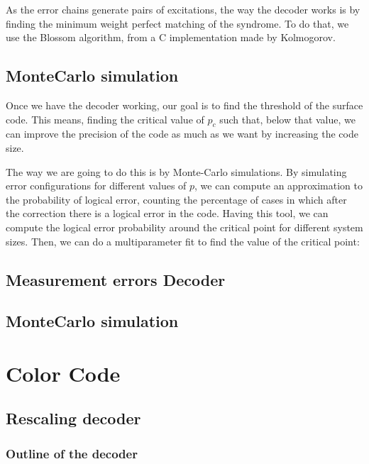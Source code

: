 \documentclass[a4paper,12pt]{article}
\begin{document}
As the error chains generate  pairs of excitations, the way the decoder works is by finding the minimum weight perfect matching of the syndrome. To do that, we use the Blossom algorithm, from a C implementation made by Kolmogorov.


\subsection{MonteCarlo simulation}

Once we have the decoder working, our goal is to find the threshold of the surface code. This means, finding the critical value of $p_c$ such that, below that value, we can improve the precision of the code as much as we want by increasing the code size.

The way we are going to do this is by Monte-Carlo simulations.  By simulating error configurations for different values of $p$, we can compute an approximation to the probability of logical error, counting the percentage of cases in which after the correction there is a logical error in the code. Having this tool, we can compute the logical error probability around the critical point for different system sizes. Then, we can do a multiparameter fit to find the value of the critical point:

\begin{figure}[ht!]
\begin{center}
\end{center}
\end{figure}


\subsection{Measurement errors Decoder}
\subsection{MonteCarlo simulation}
\newpage

\section{Color Code}
\subsection{Rescaling decoder}
\subsubsection{Outline of the decoder}
\end{document}
